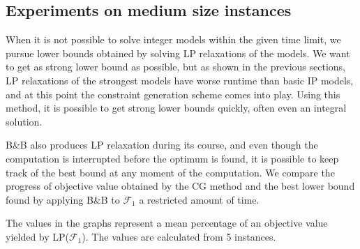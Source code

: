 \subsection{Experiments on medium size instances}

When it is not possible to solve integer models within the given time limit, we pursue lower bounds obtained by solving LP relaxations of the models.
We want to get as strong lower bound as possible, but as shown in the previous sections, LP relaxations of the strongest models have worse runtime than basic IP models, and at this point the constraint generation scheme comes into play.
Using this method, it is possible to get strong lower bounds quickly, often even an integral solution.

B\&B also produces LP relaxation during its course, and even though the computation is interrupted before the optimum is found, it is possible to keep track of the best bound at any moment of the computation.
We compare the progress of objective value obtained by the CG method and the best lower bound found by applying B\&B to $\mathcal{F}_1$ a restricted amount of time.
 
The values in the graphs represent a mean percentage of an objective value yielded by LP($\mathcal{F}_1$).
The values are calculated from 5 instances.
 
